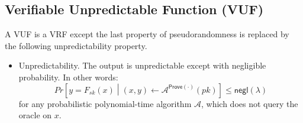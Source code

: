\documentclass[letterpaper,twocolumn,10pt]{article}
\theoremstyle{definition}
\theoremstyle{remark}
\begin{document}
\iffalse
    Furthermore, a VRF satisfies the following three properties:
    \begin{enumerate}
    \item Provability. If $(y, \pi) = \mathsf{Prove}(sk, x)$, then the tuple is accepted by the $\mathsf{Verify}$ algorithm such that $\mathsf{Verify}(pk, x, y, \pi) = 1$.
    \item Uniqueness. There does not exist $(y_1, \pi_1) \neq (y_2, \pi_2)$ such that $\mathsf{Verify}(pk, x, y_1, \pi_1) = \mathsf{Verify}(pk, x, y_2, \pi_2) = 1$.
    \item Pseudorandomness. The output is indistinguishable from a random number from a uniform distribution except with negligible probability. This can be written as follows.
    \[
    Pr\left[b = b' \middle\vert \begin{array}{l}
    (x, st) \leftarrow \mathcal{A}^{\mathsf{Prove}(\cdot)}_{1}(pk);\\
    y_0 = F_{sk}(x);\\
    y_1 \leftarrow \{0, 1\}^{\ell_{VRF}};\\
    b \leftarrow \{0, 1\};\\
    b' \leftarrow \mathcal{A}^{\mathsf{Prove}(\cdot)}_{2}(y_b, st)
    \end{array}\right] \leq \frac{1}{2} + \mathsf{negl}(\lambda)
    \]
    for any probabilistic polynomial-time algorithm $\mathcal{A} = (\mathcal{A}_1, \mathcal{A}_2)$, which does not query the oracle on $x$.
    \end{enumerate}
\fi

\subsection{Verifiable Unpredictable Function (VUF)}
\label{appendix:vuf}
A VUF \cite{micali1999verifiable,dodis2005verifiable} is a VRF except the last property of pseudorandomness is replaced by the following unpredictability property.
\begin{itemize}
\item Unpredictability. The output is unpredictable except with negligible probability. In other words:
\[
Pr\left[y = F_{sk}(x) \middle\vert (x, y) \leftarrow \mathcal{A}^{\mathsf{Prove}(\cdot)}(pk)\right] \leq \mathsf{negl}(\lambda)
\]
for any probabilistic polynomial-time algorithm $\mathcal{A}$, which does not query the oracle on $x$.
\end{itemize}
\fi

\iffalse
\end{document}
